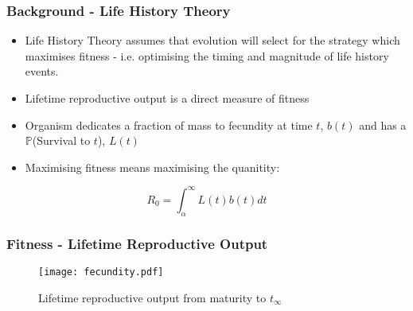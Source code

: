 \documentclass[handout]{beamer}
\begin{document}
\begin{frame}
	\frametitle{Background - Life History Theory}
	\begin{itemize}
		\item Life History Theory assumes that evolution will select for the strategy which maximises fitness - i.e. optimising the timing and magnitude of life history events.
		\item Lifetime reproductive output is a direct measure of fitness
		\item Organism dedicates a fraction of mass to fecundity at time $t$, $b(t)$ and has a $\mathbb{P}$(Survival to $t$), $L(t)$
		\item Maximising fitness means maximising the quanitity:
	\end{itemize}
	\begin{equation*}
		R_0 = \int_{\alpha}^{\infty}L(t)b(t) dt
	\end{equation*}

	
\end{frame}


\begin{frame}
	\frametitle{Fitness - Lifetime Reproductive Output}
	\bigskip
	\begin{figure}
		\texttt{[image: fecundity.pdf]}
		\caption{Lifetime reproductive output from maturity to $t_{\infty}$}
	\end{figure}
\end{frame}
\end{document}
